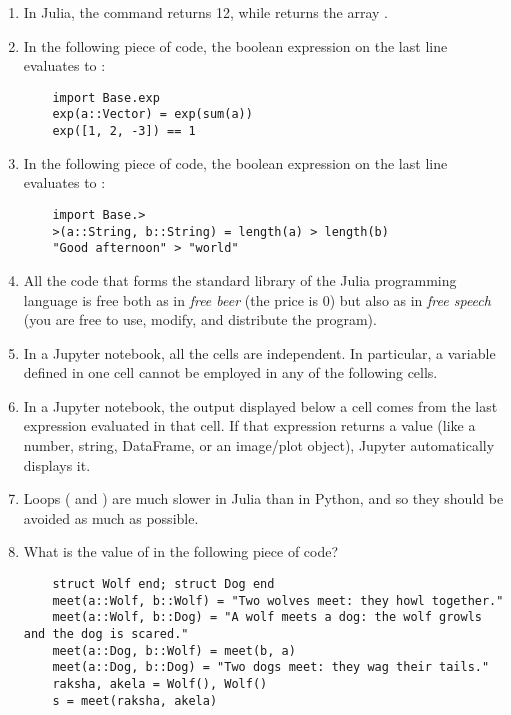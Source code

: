 \documentclass{article}
\begin{document}
\begin{enumerate}
    \item
        In Julia, the command  returns 12,
        while  returns the array \julia{[2, 3, 4]}.

    \item
        In the following piece of code,
        the boolean expression on the last line evaluates to :

        \begin{verbatim}
    import Base.exp
    exp(a::Vector) = exp(sum(a))
    exp([1, 2, -3]) == 1
        \end{verbatim}

    \item
        In the following piece of code,
        the boolean expression on the last line evaluates to :

        \begin{verbatim}
    import Base.>
    >(a::String, b::String) = length(a) > length(b)
    "Good afternoon" > "world"
        \end{verbatim}

    \item
        All the code that forms the standard library of the Julia programming language is free
        both as in \emph{free beer} (the price is 0) but also as in \emph{free speech} (you are free to use, modify, and distribute the program).

    \item
        In a Jupyter notebook,
        all the cells are independent.
        In particular, a variable defined in one cell cannot be employed in any of the following cells.

    \item
        In a Jupyter notebook, the output displayed below a cell comes from the last expression evaluated in that cell. If that expression returns a value (like a number, string, DataFrame, or an image/plot object), Jupyter automatically displays it.

    \item
        Loops ( and ) are much slower in Julia than in Python,
        and so they should be avoided as much as possible.

    \item
        What is the value of  in the following piece of code?
        \begin{verbatim}
    struct Wolf end; struct Dog end
    meet(a::Wolf, b::Wolf) = "Two wolves meet: they howl together."
    meet(a::Wolf, b::Dog) = "A wolf meets a dog: the wolf growls and the dog is scared."
    meet(a::Dog, b::Wolf) = meet(b, a)
    meet(a::Dog, b::Dog) = "Two dogs meet: they wag their tails."
    raksha, akela = Wolf(), Wolf()
    s = meet(raksha, akela)
        \end{verbatim}


\end{enumerate}
\end{document}

